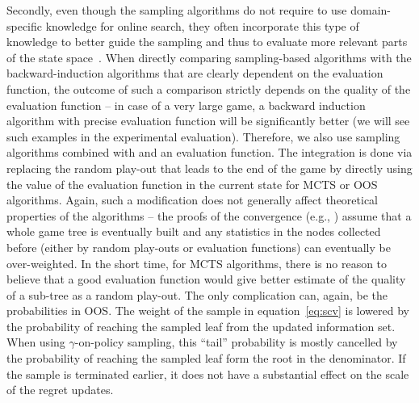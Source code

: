 Secondly, even though the sampling algorithms do not require to use domain-specific knowledge for online search, they often incorporate this type of knowledge to better guide the sampling and thus to evaluate more relevant parts of the state space~\cite{Gelly07Combining,Lorentz08Amazons,Winands10MCTS-LOA,Lorentz13Breakthrough,Lanctot14Implicit}. When directly comparing sampling-based algorithms with the backward-induction algorithms that are clearly dependent on the evaluation function, the outcome of such a comparison strictly depends on the quality of the evaluation function -- in case of a very large game, a backward induction algorithm with precise evaluation function will be significantly better (we will see such examples in the experimental evaluation). Therefore, we also use sampling algorithms combined with and an evaluation function. The integration is done via replacing the random play-out that leads to the end of the game by directly using the value of the evaluation function in the current state for MCTS or OOS algorithms. 
Again, such a modification does not generally affect theoretical properties of the algorithms -- the proofs of the convergence (e.g., \cite{lisy2013-nips}) assume that a whole game tree is eventually built and any statistics in the nodes collected before (either by random play-outs or evaluation functions) can eventually be over-weighted. In the short time, for MCTS algorithms, there is no reason to believe that a good evaluation function would give better estimate of the quality of a sub-tree as a random play-out. The only complication can, again, be the probabilities in OOS. The weight of the sample in equation~\ref{eq:scv} is lowered by the probability of reaching the sampled leaf from the updated information set. When using $\gamma$-on-policy sampling, this ``tail'' probability is mostly cancelled by the probability of reaching the sampled leaf form the root in the denominator. If the sample is terminated earlier, it does not have a substantial effect on the scale of the regret updates.
